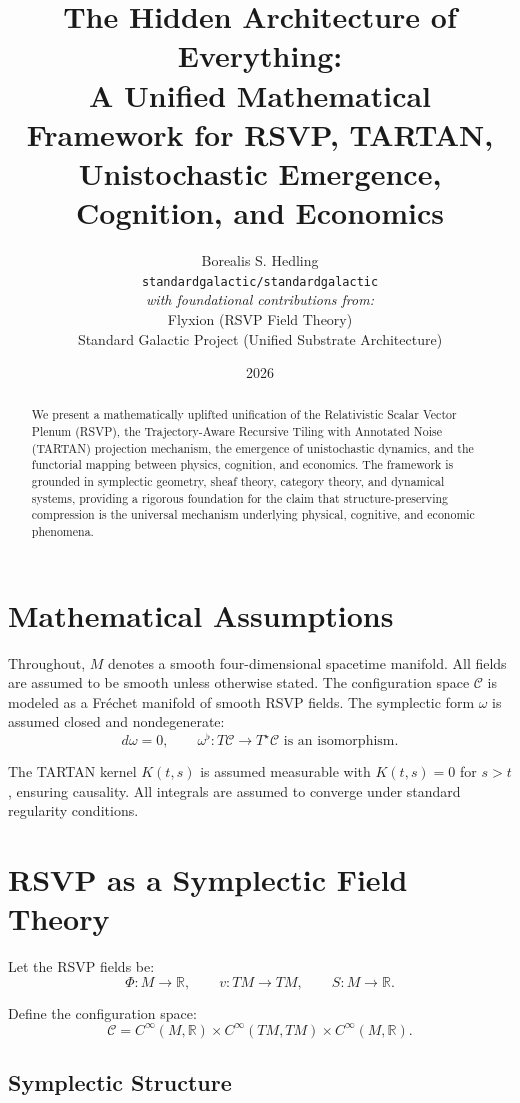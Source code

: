 \documentclass[11pt]{article}
\title{The Hidden Architecture of Everything:\\
A Unified Mathematical Framework for RSVP, TARTAN,\\
Unistochastic Emergence, Cognition, and Economics}
\author{
Borealis S. Hedling \\
\texttt{standardgalactic/standardgalactic} \\
\vspace{0.2cm}
\textit{with foundational contributions from:}\\
Flyxion (RSVP Field Theory)\\
Standard Galactic Project (Unified Substrate Architecture)
}
\date{2026}
\begin{document}
\maketitle

\begin{abstract}
We present a mathematically uplifted unification of the Relativistic Scalar
Vector Plenum (RSVP), the Trajectory-Aware Recursive Tiling with Annotated
Noise (TARTAN) projection mechanism, the emergence of unistochastic dynamics,
and the functorial mapping between physics, cognition, and economics. The
framework is grounded in symplectic geometry, sheaf theory, category theory,
and dynamical systems, providing a rigorous foundation for the claim that
structure-preserving compression is the universal mechanism underlying physical,
cognitive, and economic phenomena.
\end{abstract}

\section{Mathematical Assumptions}

Throughout, $M$ denotes a smooth four-dimensional spacetime manifold. All fields
are assumed to be smooth unless otherwise stated. The configuration space
$\mathcal{C}$ is modeled as a Fréchet manifold of smooth RSVP fields. The
symplectic form $\omega$ is assumed closed and nondegenerate:
\[
d\omega = 0, \qquad \omega^\flat : T\mathcal{C} \to T^\star\mathcal{C}
\text{ is an isomorphism}.
\]

The TARTAN kernel $K(t,s)$ is assumed measurable with $K(t,s)=0$ for $s>t$,
ensuring causality. All integrals are assumed to converge under standard
regularity conditions.

\section{RSVP as a Symplectic Field Theory}

Let the RSVP fields be:
\[
\Phi : M \to \mathbb{R}, \qquad
v : TM \to TM, \qquad
S : M \to \mathbb{R}.
\]

Define the configuration space:
\[
\mathcal{C} = C^\infty(M,\mathbb{R}) \times C^\infty(TM,TM) \times
C^\infty(M,\mathbb{R}).
\]

\subsection{Symplectic Structure}
\end{document}
